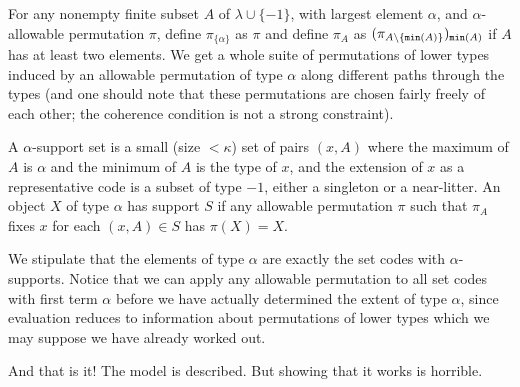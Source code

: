 \documentclass{slides}
\begin{document}
\begin{slide}

For any nonempty finite subset $A$ of $\lambda \cup \{-1\}$, with largest element $\alpha$, and $\alpha$-allowable permutation $\pi$, define $\pi_{\{\alpha\}}$ as $\pi$ and define $\pi_A$ as $(\pi_{A \setminus \{{\tt min}(A)\}})_{{\tt min}(A)}$ if $A$ has at least two elements.  We get a whole suite of permutations of lower types induced by an allowable permutation of type $\alpha$ along different paths through the types (and one should note that these permutations are chosen fairly freely of each other;  the coherence condition is not a strong constraint).

A $\alpha$-support set is a small (size $<\kappa$) set of pairs $(x,A)$ where the maximum of $A$ is $\alpha$ and the minimum of $A$ is the type of $x$, and the extension of $x$ as a representative code is a subset of type $-1$, either a singleton or a near-litter.  An object $X$ of type $\alpha$ has support $S$ if any allowable permutation $\pi$ such that
$\pi_A$ fixes $x$ for each $(x,A) \in S$ has $\pi(X)=X$.

We stipulate that the elements of type $\alpha$ are exactly the set codes with $\alpha$-supports.  Notice that we can
apply any allowable permutation to all set codes with first term $\alpha$ before we have actually determined the extent of type $\alpha$, since evaluation reduces to information about permutations of lower types which we may suppose we have already worked out.

And that is it!  The model is described.  But showing that it works is horrible.

\end{slide}
\end{document}
